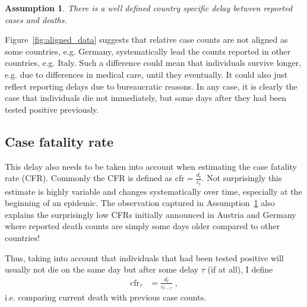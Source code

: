 \documentclass[fullpage,a4paper]{article}
\newcommand{\fig}[1]{Figure~\ref{fig:#1}}
\newcommand{\hyp}[1]{Assumption~\ref{hyp:#1}}
\newtheorem{hypothesis}{Assumption}
\begin{document}
\begin{hypothesis}
  \label{hyp:delay}
  There is a well defined country specific delay between reported
  cases and deaths.
\end{hypothesis}

\fig{aligned_data} suggests that relative case counts are not aligned
as some countries, e.g. Germany, systematically lead the counts
reported in other countries, e.g. Italy. Such a difference could mean
that individuals survive longer, e.g. due to differences in medical
care, until they eventually. It could also just reflect reporting
delays due to bureaucratic reasons. In any case, it is clearly the
case that individuals die not immediately, but some days after they
had been tested positive previously.

\subsection{Case fatality rate}

This delay also needs to be taken into account when estimating the
case fatality rate (CFR). Commonly the CFR is defined as $\mathrm{cfr}
= \frac{d_t}{c_t}$. Not surprisingly this estimate is highly variable
and changes systematically over time, especially at the beginning of
an epidemic. The observation captured in \hyp{delay} also explains the
surprisingly low CFRs initially announced in Austria and Germany where
reported death counts are simply some days older compared to other
countries!

Thus, taking into account that individuals that had been tested
positive will usually not die on the same day but after some delay
$\tau$ (if at all), I define
\begin{align}
  \label{eq:cfr}
  \mathrm{cfr}_{\tau} &= \frac{d_t}{c_{t - \tau}} \; ,
\end{align}
i.e. comparing current death with previous case counts.
\end{document}
